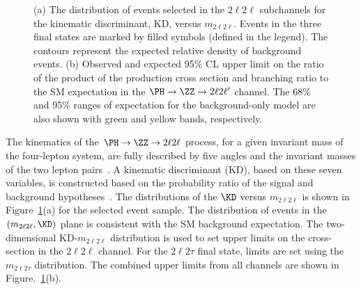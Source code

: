 %
\begin{figure}[htbp]
\begin{center}
%
%
\caption{ (a) 
The distribution of events
selected in the $2\ell2\ell$ 
subchannels for the kinematic discriminant, KD, versus $m_{2\ell2\ell}$.
Events in the three final states are marked by filled symbols (defined in the legend).
The contours represent the expected relative density of background events.
(b) Observed and expected 95\% CL upper limit on the ratio of the product of the production cross section and
 branching ratio to the 
SM expectation in the $\PH \to \ZZ \to 2\ell 2\ell '$ channel.
The 68\% and 95\% ranges of expectation  for the background-only model 
are also shown with green and yellow bands, respectively.
}
\label{fig:KDvsM4lFullMass}
\end{center}
\end{figure}

The kinematics of the $\PH\to\ZZ \to 2\ell2\ell$ process, for a given invariant mass of the four-lepton system,
are fully described by five angles and the invariant masses of the two lepton pairs~\cite{Cabibbo:1965zz,Gao:2010qx,DeRujula:2010ys}. A kinematic discriminant (KD), based on these seven variables, is constructed based on the probability ratio of the signal and background hypotheses~\cite{2l2qpaper}. The distributions of the $\KD$ versus $m_{2\ell 2\ell}$ is shown in Figure~\ref{fig:KDvsM4lFullMass}(a) for the selected event sample. The distribution of events in the $(m_{2\ell 2\ell}, \KD)$ plane is consistent with the SM background expectation. The
two-dimensional KD-$m_{2\ell2\ell}$ distribution is used to set upper limits on the cross-section in the $2\ell2\ell$ 
channel. For the $2\ell2\tau$ final state, limits are set using the $m_{2\ell2\tau}$ distribution. The combined upper
limits from all channels are shown in Figure.~\ref{fig:KDvsM4lFullMass}(b).


